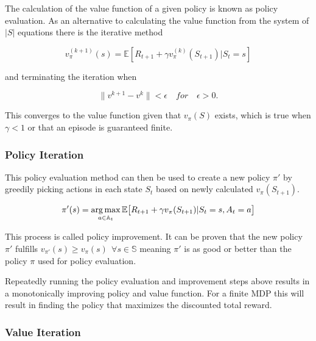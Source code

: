 The calculation of the value function of a given policy is known as policy evaluation. As an alternative to calculating the value function from the system of $|S|$ equations there is the iterative method

\begin{equation}
    v_\pi^{(k+1)}(s) = \mathbb{E}[R_{t+1} + \gamma v_\pi^{(k)}(S_{t+1})| S_t=s]
    \label{eq:policy_eval}
\end{equation}

and terminating the iteration when 

\begin{equation}
    \| v^{k+1} - v^k \| < \epsilon \quad for \quad \epsilon > 0.
    \label{eq:policy_eval_termination_condition}
\end{equation}

This converges to the value function given that $v_\pi(S)$ exists, which is true when $\gamma < 1$ or that an episode is guaranteed finite.


\subsubsection{Policy Iteration}

This policy evaluation method can then be used to create a new policy $\pi'$ by greedily picking actions in each state $S_t$ based on newly calculated $v_\pi(S_{t+1})$. 

\begin{equation}
    \pi'(s) = \operatorname*{arg\,max}_{a\in \mathbb{A}_t} \mathbb{E}\big[R_{t+1} + \gamma v_\pi(S_{t+1})|S_t=s, A_t=a\big]
    \label{eq:policy_iter}
\end{equation}

This process is called policy improvement. It can be proven that the new policy $\pi'$ fulfills $v_{\pi'}(s) \geq v_\pi(s) ~~ \forall s \in \mathbb{S}$ meaning $\pi'$ is as good or better than the policy $\pi$ used for policy evaluation. \citep[p.~78-79]{sutton_barto_2018}

Repeatedly running the policy evaluation and improvement steps above results in a monotonically improving policy and value function. For a finite MDP this will result in finding the policy that maximizes the discounted total reward.


\subsubsection{Value Iteration}


